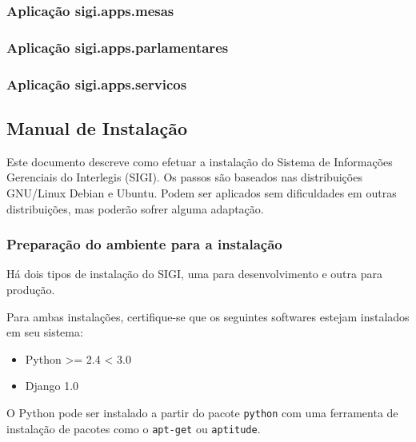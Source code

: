 \subsubsection{Aplicação sigi.apps.mesas}


\subsubsection{Aplicação sigi.apps.parlamentares}


\subsubsection{Aplicação sigi.apps.servicos}

\normalsize

\subsection{Manual de Instalação}
\label{sec:a3}
Este documento descreve como efetuar a instalação do Sistema de
Informações Gerenciais do Interlegis (SIGI). Os passos são baseados
nas distribuições GNU/Linux Debian e Ubuntu. Podem ser aplicados sem
dificuldades em outras distribuições, mas poderão sofrer alguma
adaptação.



\hypertarget{prepara-o-do-ambiente-para-a-instala-o}{}
\subsubsection{Preparação do ambiente para a instalação}

Há dois tipos de instalação do SIGI, uma para desenvolvimento e outra
para produção.

Para ambas instalações, certifique-se que os seguintes softwares
estejam instalados em seu sistema:
\begin{itemize}
\item {} 
Python {\textgreater}= 2.4 {\textless} 3.0

\item {} 
Django 1.0

\end{itemize}

O Python pode ser instalado a partir do pacote \texttt{python} com uma
ferramenta de instalação de pacotes como o \texttt{apt-get} ou
\texttt{aptitude}.


